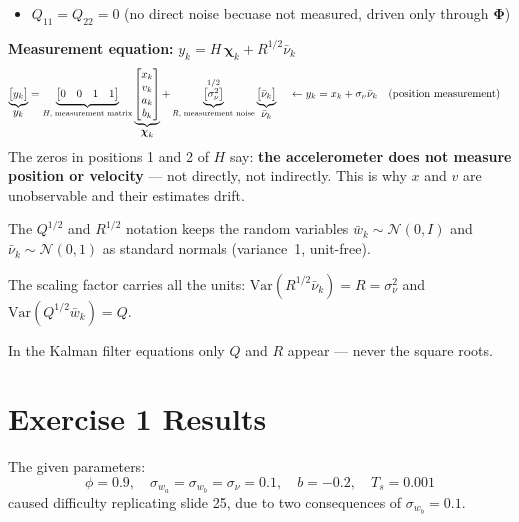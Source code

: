 \documentclass[12pt, a4paper]{article}
\begin{document}
\vspace{-0.2cm}
\begin{itemize}[leftmargin=1.4em]
  \item $Q_{11} = Q_{22} = 0$ \quad (no direct noise becuase not measured, driven only through $\boldsymbol{\Phi}$)
\end{itemize}
\textbf{Measurement equation:}
$y_k = H\,\boldsymbol{\chi}_k + R^{1/2}\bar{\nu}_k$
\[
\underbrace{
\begin{bmatrix} y_k \end{bmatrix}
}_{\displaystyle y_k}
=
\underbrace{
\begin{bmatrix} 0 & 0 & 1 & 1 \end{bmatrix}
}_{H,\;{\scriptsize\text{measurement matrix}}}
\underbrace{
\begin{bmatrix} x_k \\ v_k \\ a_k \\ b_k \end{bmatrix}
}_{\displaystyle\boldsymbol{\chi}_k}
+
\underbrace{
\begin{bmatrix} \sigma_{\nu}^2 \end{bmatrix}
}_{R,\;{\scriptsize\text{measurement noise}}}^{1/2}
\underbrace{
\begin{bmatrix} \bar{\nu}_k \end{bmatrix}
}_{\displaystyle\bar{\nu}_k}
\quad
\begin{aligned}
  &\leftarrow y_k = x_k + \sigma_{\nu}\bar{\nu}_k \quad \text{(position measurement)}
\end{aligned}
\]
The zeros in positions 1 and 2 of $H$ say: \textbf{the accelerometer does not
measure position or velocity} --- not directly, not indirectly.
This is why $x$ and $v$ are unobservable and their estimates drift.

\begin{notebox}
    The $Q^{1/2}$ and $R^{1/2}$ notation keeps the random variables
$\bar{w}_k \sim \mathcal{N}(0,I)$ and $\bar{\nu}_k \sim \mathcal{N}(0,1)$
as standard normals (variance~1, unit-free).

The scaling factor carries all the units:
$\mathrm{Var}(R^{1/2}\bar{\nu}_k) = R = \sigma_\nu^2$ and
$\mathrm{Var}(Q^{1/2}\bar{w}_k) = Q$.

In the Kalman filter equations only $Q$ and $R$ appear --- never the square roots.
\end{notebox}
\clearpage
\section*{Exercise 1 Results}
The given parameters:
\[
  \phi = 0.9, \quad
  \sigma_{w_a} = \sigma_{w_b} = \sigma_\nu = 0.1, \quad
  b = -0.2, \quad
  T_s = 0.001
\]
caused difficulty replicating slide 25, due to two consequences of $\sigma_{w_b} = 0.1$.
\end{document}
